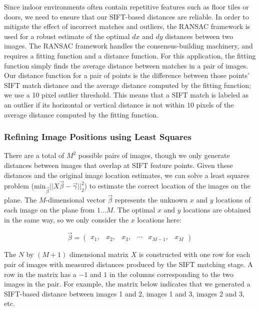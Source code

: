 \documentclass[10pt,twocolumn,letterpaper]{article}
\begin{document}
Since indoor environments often contain repetitive features such as
floor tiles or doors, we need to ensure that our SIFT-based distances
are reliable. In order to mitigate the effect of incorrect matches and
outliers, the RANSAC framework \cite{fischler1981random} is used for a
robust estimate of the optimal $dx$ and $dy$ distances between two
images. The RANSAC framework handles the consensus-building machinery,
and requires a fitting function and a distance function. For this
application, the fitting function simply finds the average distance
between matches in a pair of images. Our distance function for a pair
of points is the difference between those points' SIFT match distance
and the average distance computed by the fitting function; we use a 10
pixel outlier threshold. This means that a SIFT match is labeled as an
outlier if its horizontal or vertical distance is not within 10 pixels
of the average distance computed by the fitting function.

\subsubsection{Refining Image Positions using Least Squares}
\label{sec:refiningImagePositions}
There are a total of $M^{2}$ possible pairs of images, though we only
generate distances between images that overlap at SIFT feature
points. Given these distances and the original image location
estimates, we can solve a least squares problem ($\textrm{min}_{\vec{\beta}}
||X \vec{\beta} - \vec{\gamma}||_2^2 $) to estimate the correct location of the images
on the plane. The $M$-dimensional vector $\vec{\beta}$ represents the unknown $x$
and $y$ locations of each image on the plane from $1 \dots M$. The
optimal $x$ and $y$ locations are obtained in the same way, so we
only consider the $x$ locations here:


\[\vec{\beta} =
\begin{pmatrix}
  x_1, & x_2, & x_3, & \cdots & x_{M-1}, & x_M
\end{pmatrix}
\]

The $N$ by $(M+1)$ dimensional matrix $X$ is constructed with one row for each pair of images
with measured distances produced by the SIFT matching stage. A row in
the matrix has a $-1$ and $1$ in the columns corresponding to the two
images in the pair. For example, the matrix below indicates that we
generated a SIFT-based distance between images 1 and 2, images 1 and
3, images 2 and 3, etc.
\end{document}
